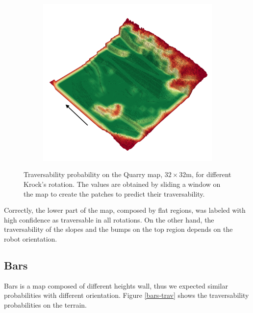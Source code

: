 \documentclass[../document.tex]{subfiles}
\begin{document}
\begin{figure} [htbp]
\begin{subfigure}[b]{0.45\textwidth}
\end{subfigure}
\begin{subfigure}[b]{0.45\textwidth}
    \includegraphics[width=\linewidth]{../img/4/traversability/quarry/-180.png}  
\end{subfigure}
\caption{Traversability probability on the Quarry map, $32\times 32$m, for different Krock's rotation. The values are obtained by sliding a window on the map to create the patches to predict their traversability.}
\label{fig : quarry-trav}
\end{figure}
 Correctly, the lower part of the map, composed by flat regions, was labeled with high confidence as traversable in all rotations. On the other hand, the traversability of the slopes and the bumps on the top region depends on the robot orientation.

\subsection{Bars}
Bars is a map composed of different heights wall, thus we expected similar probabilities with different orientation. Figure \ref{bars-trav} shows the traversability probabilities on the terrain.
\end{document}
